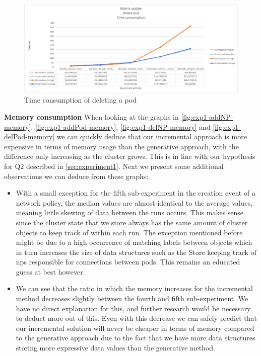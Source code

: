 \begin{figure}[H]
    \centering
    \includegraphics[width=\textwidth]{images/experiment1/delPod-time.png}
    \caption{Time consumption of deleting a pod}
    \label{fig:exp1-delPod-time}
\end{figure}



\textbf{Memory consumption}
\newline When looking at the graphs in \autoref{fig:exp1-addNP-memory}, \autoref{fig:exp1-addPod-memory}, \autoref{fig:exp1-delNP-memory}  and \autoref{fig:exp1-delPod-memory} we can quickly deduce that our incremental approach is more expensive in terms of memory usage than the generative approach, with the difference only increasing as the cluster grows. This is in line with our hypothesis for Q2 described in \autoref{sec:experiment1}. Next we present some additional observations we can deduce from these graphs:
\begin{itemize}
    \item With a small exception for the fifth sub-experiment in the creation event of a network policy, the median values are almost identical to the average values, meaning little skewing of data between the runs occurs. This makes sense since the cluster state that we store always has the same amount of cluster objects to keep track of within each run. The exception mentioned before might be due to a high occurrence of matching labels between objects which in turn increases the size of data structures such as the Store keeping track of \acrshort{np}s responsible for connections between pods. This remains an educated guess at best however.
    \item We can see that the ratio in which the memory increases for the incremental method decreases slightly between the fourth and fifth sub-experiment. We have no direct explanation for this, and further research would be necessary to deduct more out of this. Even with this decrease we can safely predict that our incremental solution will never be cheaper in terms of memory compared to the generative approach due to the fact that we have more data structures storing more expressive data values than the generative method.
\end{itemize}

